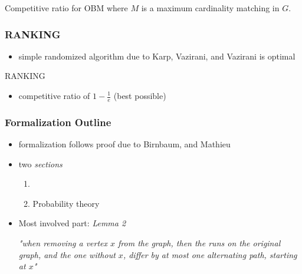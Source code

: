 \documentclass{beamer}
\DeclarePairedDelimiter\card{\lvert}{\rvert}
\begin{document}
\begin{frame}
\begin{columns}
\begin{column}{.3\textwidth}
    \end{column}
  \end{columns}
  \begin{block}{Competitive ratio for OBM}
    where $M$ is a maximum cardinality matching in $G$.
  \end{block}
\end{frame}

\begin{frame}
  \frametitle{RANKING}
  \onslide<+->
  \begin{itemize}
    \item simple randomized algorithm due to Karp, Vazirani, and Vazirani is optimal~\cite{karp1990}
  \end{itemize}
  \onslide<+->
  \begin{algorithm}[H]
  \small
  \DontPrintSemicolon
  \caption{RANKING}\label{alg:ranking}
  \Online{}
  \end{algorithm}
  \onslide<+->
  \begin{itemize}
    \item competitive ratio of $1 - \frac{1}{e}$ (best possible)
  \end{itemize}
\end{frame}

\begin{frame}
  \frametitle{Formalization Outline}
  \begin{itemize}[<+->]
    \item formalization follows proof due to Birnbaum, and Mathieu~\cite{birnbaum2008}
    \item two \emph{sections}
    \begin{enumerate}
      \item {} 
      \item Probability theory
    \end{enumerate}
    \item Most involved part: \emph{Lemma 2}
    
    \emph{"when removing a vertex $x$ from the graph, then the runs on the original
      graph, and the one without $x$, differ by at most one alternating path, starting
      at $x$"}
  \end{itemize}
\end{frame}
\end{document}
